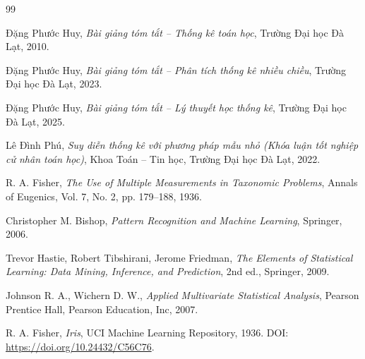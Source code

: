 \documentclass[12pt,a4paper,oneside]{report}
\begin{document}
\clearpage
{}
\begin{thebibliography}{99}

Đặng Phước Huy,
\textit{Bài giảng tóm tắt -- Thống kê toán học},
Trường Đại học Đà Lạt, 2010.

Đặng Phước Huy,
\textit{Bài giảng tóm tắt -- Phân tích thống kê nhiều chiều},
Trường Đại học Đà Lạt, 2023.

Đặng Phước Huy,
\textit{Bài giảng tóm tắt -- Lý thuyết học thống kê},
Trường Đại học Đà Lạt, 2025.

Lê Đình Phú,
\textit{Suy diễn thống kê với phương pháp mẫu nhỏ (Khóa luận tốt nghiệp cử nhân toán học)},
Khoa Toán -- Tin học, Trường Đại học Đà Lạt, 2022.

R. A. Fisher,
\textit{The Use of Multiple Measurements in Taxonomic Problems},
Annals of Eugenics, Vol. 7, No. 2, pp. 179--188, 1936.

Christopher M. Bishop,
\textit{Pattern Recognition and Machine Learning},
Springer, 2006.

Trevor Hastie, Robert Tibshirani, Jerome Friedman,
\textit{The Elements of Statistical Learning: Data Mining, Inference, and Prediction},
2nd ed., Springer, 2009.

Johnson R. A., Wichern D. W.,
\textit{Applied Multivariate Statistical Analysis},
Pearson Prentice Hall, Pearson Education, Inc, 2007.

R. A. Fisher,
\textit{Iris},
UCI Machine Learning Repository, 1936.
DOI: \url{https://doi.org/10.24432/C56C76}.

\end{thebibliography}
\end{document}
